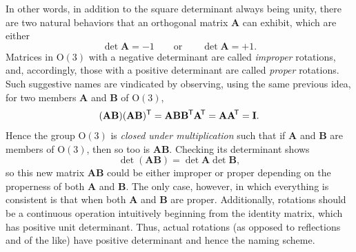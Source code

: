 \documentclass[11pt,dvipsnames]{thesis}
\begin{document}


In other words, in addition to the square determinant always being unity, there are two natural behaviors that an orthogonal matrix $\mathbf{A}$ can exhibit, which are either
\begin{equation}
\det\mathbf{A} = -1 \qquad \text{or} \qquad \det\mathbf{A} = +1.
\end{equation}
Matrices in $\mathrm{O}(3)$ with a negative determinant are called \textit{improper} rotations, and, accordingly, those with a positive determinant are called \textit{proper} rotations. Such suggestive names are vindicated by observing, using the same previous idea, for two members $\mathbf{A}$ and $\mathbf{B}$ of $\mathrm{O}(3)$,
\begin{equation}
(\mathbf{A}\mathbf{B})(\mathbf{AB})^\mathsf{T} = \mathbf{A}\mathbf{B}\mathbf{B}^{\hspace{-0.025em}\mathsf{T}} \hspace{-0.025em} \mathbf{A}^{\!\mathsf{T}} = \mathbf{A}\mathbf{A}^{\!\mathsf{T}} = \mathbf{I}.
\end{equation}
Hence the group $\mathrm{O}(3)$ is \textit{closed under multiplication} such that if $\mathbf{A}$ and $\mathbf{B}$ are members of $\mathrm{O}(3)$, then so too is $\mathbf{AB}$. Checking its determinant shows 
\begin{equation}
\det(\mathbf{AB}) = \det\mathbf{A} \det\mathbf{B},
\end{equation}
so this new matrix $\mathbf{AB}$ could be either improper or proper depending on the properness of both $\mathbf{A}$ and $\mathbf{B}$. The only case, however, in which everything is consistent is that when both $\mathbf{A}$ and $\mathbf{B}$ are proper. Additionally, rotations should be a continuous operation intuitively beginning from the identity matrix, which has positive unit determinant. Thus, actual rotations (as opposed to reflections and of the like) have positive determinant and hence the naming scheme.
\end{document}
